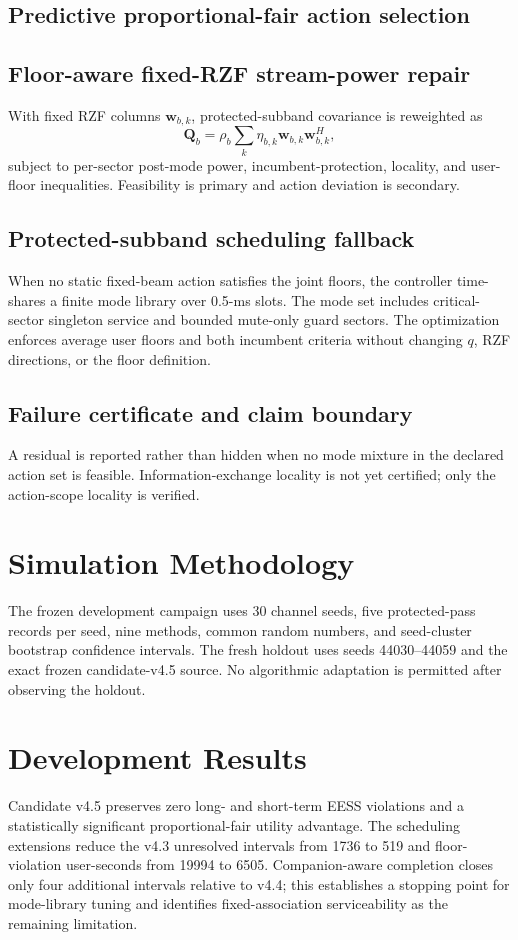 \documentclass[journal]{IEEEtran}
\begin{document}
\subsection{Predictive proportional-fair action selection}
\subsection{Floor-aware fixed-RZF stream-power repair}
With fixed RZF columns $\mathbf w_{b,k}$, protected-subband covariance is reweighted as
\begin{equation}
 \mathbf Q_b=\rho_b\sum_k \eta_{b,k}\mathbf w_{b,k}\mathbf w_{b,k}^{H},
\end{equation}
subject to per-sector post-mode power, incumbent-protection, locality, and user-floor inequalities. Feasibility is primary and action deviation is secondary.
\subsection{Protected-subband scheduling fallback}
When no static fixed-beam action satisfies the joint floors, the controller time-shares a finite mode library over 0.5-ms slots. The mode set includes critical-sector singleton service and bounded mute-only guard sectors. The optimization enforces average user floors and both incumbent criteria without changing $q$, RZF directions, or the floor definition.
\subsection{Failure certificate and claim boundary}
A residual is reported rather than hidden when no mode mixture in the declared action set is feasible. Information-exchange locality is not yet certified; only the action-scope locality is verified.

\section{Simulation Methodology}
The frozen development campaign uses 30 channel seeds, five protected-pass records per seed, nine methods, common random numbers, and seed-cluster bootstrap confidence intervals. The fresh holdout uses seeds 44030--44059 and the exact frozen candidate-v4.5 source. No algorithmic adaptation is permitted after observing the holdout.

\section{Development Results}

Candidate v4.5 preserves zero long- and short-term EESS violations and a statistically significant proportional-fair utility advantage. The scheduling extensions reduce the v4.3 unresolved intervals from 1736 to 519 and floor-violation user-seconds from 19994 to 6505. Companion-aware completion closes only four additional intervals relative to v4.4; this establishes a stopping point for mode-library tuning and identifies fixed-association serviceability as the remaining limitation.
\end{document}
